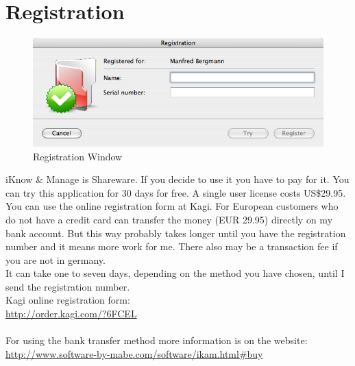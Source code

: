 \documentclass[12pt,a4]{article}
\begin{document}
\section{Registration}
\label{registration}
\medskip
% 
\begin{figure}[ht]
\begin{center}
\includegraphics[width=13.5cm]{images/Registration_Window.png}
\end{center}
\caption{Registration Window}
\label{image:registration}
\end{figure}
\noindent
%
iKnow \& Manage is Shareware. If you decide to use it you have to pay for it. You can try this application for 30 days for free. A single user license costs US\$29.95. You can use the online registration form at Kagi. For European customers who do not have a credit card can transfer the money (EUR 29.95) directly on my bank account. But this way probably takes longer until you have the registration number and it means more work for me. There also may be a transaction fee if you are not in germany. \\
It can take one to seven days, depending on the method you have chosen, until I send the registration number.
\\
Kagi online registration form: \\
\href{http://order.kagi.com/?6FCEL}{http://order.kagi.com/?6FCEL} \\
\\
For using the bank transfer method more information is on the website: \\
\href{http://www.software-by-mabe.com/software/ikam.html#buy}{http://www.software-by-mabe.com/software/ikam.html\#buy}
\end{document}
